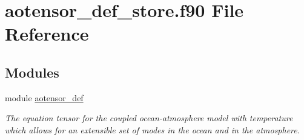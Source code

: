 \hypertarget{aotensor__def__store_8f90}{}\section{aotensor\+\_\+def\+\_\+store.\+f90 File Reference}
\label{aotensor__def__store_8f90}
\subsection*{Modules}
\begin{DoxyCompactItemize}
\item 
module \hyperlink{namespaceaotensor__def}{aotensor\+\_\+def}
\begin{DoxyCompactList}\small\item\em The equation tensor for the coupled ocean-\/atmosphere model with temperature which allows for an extensible set of modes in the ocean and in the atmosphere. \end{DoxyCompactList}\end{DoxyCompactItemize}
